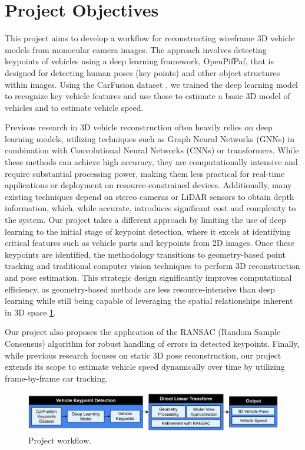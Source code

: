 \documentclass[conference]{IEEEtran}
\begin{document}
\section{Project Objectives}

This project aims to develop a workflow for reconstructing wireframe 3D vehicle models from monocular camera images. The approach involves detecting keypoints of vehicles using a deep learning framework, OpenPifPaf, that is designed for detecting human poses (key points) and other object structures within images. Using the CarFusion dataset \cite{CFusion}, we trained the deep learning model to recognize key vehicle features and use those to estimate a basic 3D model of vehicles and to estimate vehicle speed.

Previous research in 3D vehicle reconstruction often heavily relies on deep learning models, utilizing techniques such as Graph Neural Networks (GNNs) in combination with Convolutional Neural Networks (CNNs) or transformers. While these methods can achieve high accuracy, they are computationally intensive and require substantial processing power, making them less practical for real-time applications or deployment on resource-constrained devices. Additionally, many existing techniques depend on stereo cameras or LiDAR sensors to obtain depth information, which, while accurate, introduces significant cost and complexity to the system. Our project takes a different approach by limiting the use of deep learning to the initial stage of keypoint detection, where it excels at identifying critical features such as vehicle parts and keypoints from 2D images. Once these keypoints are identified, the methodology transitions to geometry-based point tracking and traditional computer vision techniques to perform 3D reconstruction and pose estimation. This strategic design significantly improves computational efficiency, as geometry-based methods are less resource-intensive than deep learning while still being capable of leveraging the spatial relationships inherent in 3D space
\ref{img:workflow}.

Our project also proposes the application of the RANSAC (Random Sample Consensus) algorithm for robust handling of errors in detected keypoints. Finally, while previous research focuses on static 3D pose reconstruction, our project extends its scope to estimate vehicle speed dynamically over time by utilizing frame-by-frame car tracking.

\begin{figure}
    \centering
    \includegraphics[width=1\columnwidth]{./images/workflow.png}
    \caption{Project workflow.}
    \label{img:workflow}
\end{figure}
\end{document}

